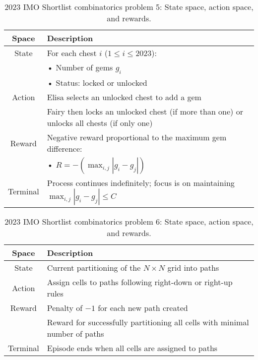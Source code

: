 \begin{table}[htb]
\caption{2023 IMO Shortlist combinatorics problem 5: State space, action space, and rewards.}
  \centering
  \small
\begin{tabular}{cl}
  \toprule
Space    & Description \\
\midrule
State    & For each chest $i$ ($1 \leq i \leq 2023$): \\
         & • Number of gems $g_i$ \\
         & • Status: locked or unlocked \\
Action   & Elisa selects an unlocked chest to add a gem \\
         & Fairy then locks an unlocked chest (if more than one) or unlocks all chests (if only one) \\
Reward   & Negative reward proportional to the maximum gem difference: \\
         & • $R = - (\max_{i,j} |g_i - g_j|)$ \\
Terminal & Process continues indefinitely; focus is on maintaining $\max_{i,j} |g_i - g_j| \leq C$ \\
\bottomrule
\end{tabular}
\end{table}






\begin{table}[htb]
\caption{2023 IMO Shortlist combinatorics problem 6: State space, action space, and rewards.}
  \centering
  \small
\begin{tabular}{cl}
  \toprule
Space    & Description \\
\midrule
State    & Current partitioning of the $N \times N$ grid into paths \\
Action   & Assign cells to paths following right-down or right-up rules \\
Reward   & Penalty of $-1$ for each new path created \\
         & Reward for successfully partitioning all cells with minimal number of paths \\
Terminal & Episode ends when all cells are assigned to paths \\
\bottomrule
\end{tabular}
\end{table}





